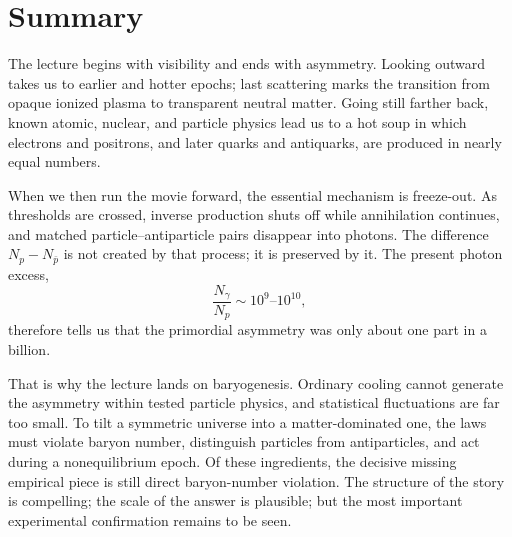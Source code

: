 \section{Summary}

The lecture begins with visibility and ends with asymmetry. Looking outward takes us to earlier and hotter epochs; last scattering marks the transition from opaque ionized plasma to transparent neutral matter. Going still farther back, known atomic, nuclear, and particle physics lead us to a hot soup in which electrons and positrons, and later quarks and antiquarks, are produced in nearly equal numbers.

When we then run the movie forward, the essential mechanism is freeze-out. As thresholds are crossed, inverse production shuts off while annihilation continues, and matched particle--antiparticle pairs disappear into photons. The difference \(N_p-N_{\bar p}\) is not created by that process; it is preserved by it. The present photon excess,
\begin{equation}
\frac{N_\gamma}{N_p}\sim 10^9\text{--}10^{10},
\end{equation}
therefore tells us that the primordial asymmetry was only about one part in a billion.

That is why the lecture lands on baryogenesis. Ordinary cooling cannot generate the asymmetry within tested particle physics, and statistical fluctuations are far too small. To tilt a symmetric universe into a matter-dominated one, the laws must violate baryon number, distinguish particles from antiparticles, and act during a nonequilibrium epoch. Of these ingredients, the decisive missing empirical piece is still direct baryon-number violation. The structure of the story is compelling; the scale of the answer is plausible; but the most important experimental confirmation remains to be seen.
